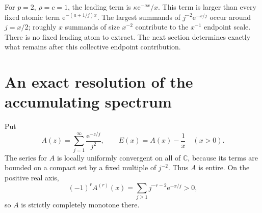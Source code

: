 \documentclass[11pt,a4paper]{article}
\theoremstyle{definition}
\theoremstyle{remark}
\newcommand{\C}{\mathbb C}
\newcommand{\e}{\mathrm e}
\numberwithin{equation}{section}
\begin{document}
For $p=2$, $\rho=c=1$, the leading term is $\kappa\e^{-ax}/x$. This term is larger than every fixed atomic term $\e^{-(a+1/j)x}$. The largest summands of $j^{-2}\e^{-x/j}$ occur around $j=x/2$; roughly $x$ summands of size $x^{-2}$ contribute to the $x^{-1}$ endpoint scale. There is no fixed leading atom to extract. The next section determines exactly what remains after this collective endpoint contribution.

\section{An exact resolution of the accumulating spectrum}\label{sec:poisson}

Put
\begin{equation}\label{eq:Adef}
 A(z)=\sum_{j=1}^{\infty}\frac{\e^{-z/j}}{j^2},
 \qquad E(x)=A(x)-\frac1x\quad(x>0).
\end{equation}
The series for $A$ is locally uniformly convergent on all of $\C$, because its terms are bounded on a compact set by a fixed multiple of $j^{-2}$. Thus $A$ is entire. On the positive real axis,
\[
 (-1)^rA^{(r)}(x)=\sum_{j\ge1}j^{-r-2}\e^{-x/j}>0,
\]
so $A$ is strictly completely monotone there.
\end{document}
